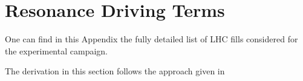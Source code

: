 \chapter{Resonance Driving Terms} %

\label{AppendixB} %

One can find in this Appendix the fully detailed list of LHC fills considered for the experimental campaign.

The derivation in this section follows the approach given in 

